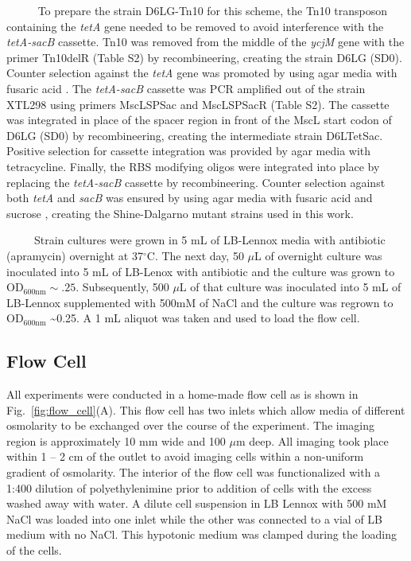 \documentclass[12pt]{caltech_thesis}
\begin{document}
~~~~~ To prepare the strain D6LG-Tn10 for this scheme, the Tn10
transposon containing the \emph{tetA} gene needed to be removed to avoid
interference with the \emph{tetA-sacB} cassette. Tn10 was removed from
the middle of the \emph{ycjM} gene with the primer Tn10delR (Table S2)
by recombineering, creating the strain D6LG (SD0). Counter selection
against the \emph{tetA} gene was promoted by using agar media with
fusaric acid \autocite{bochner1980,li2013}. The \emph{tetA-sacB}
cassette was PCR amplified out of the strain XTL298 using primers
MscLSPSac and MscLSPSacR (Table S2). The cassette was integrated in
place of the spacer region in front of the MscL start codon of D6LG
(SD0) by recombineering, creating the intermediate strain D6LTetSac.
Positive selection for cassette integration was provided by agar media
with tetracycline. Finally, the RBS modifying oligos were integrated
into place by replacing the \emph{tetA-sacB} cassette by recombineering.
Counter selection against both \emph{tetA} and \emph{sacB} was ensured
by using agar media with fusaric acid and sucrose \autocite{li2013},
creating the Shine-Dalgarno mutant strains used in this work.

~~~~~Strain cultures were grown in 5 mL of LB-Lennox media with
antibiotic (apramycin) overnight at 37\(^\circ\)C. The next day, 50
\(\mu\)L of overnight culture was inoculated into 5 mL of LB-Lenox with
antibiotic and the culture was grown to OD\(_\text{600nm} \sim .25\).
Subsequently, 500 \(\mu\)L of that culture was inoculated into 5 mL of
LB-Lennox supplemented with 500mM of NaCl and the culture was regrown to
OD\(_\text{600nm}\) \textasciitilde0.25. A 1 mL aliquot was taken and
used to load the flow cell.

\hypertarget{flow-cell}{%
\subsection{Flow Cell}\label{flow-cell}}

All experiments were conducted in a home-made flow cell as is shown in
Fig.~\ref{fig:flow_cell}(A). This flow cell has two inlets which allow
media of different osmolarity to be exchanged over the course of the
experiment. The imaging region is approximately 10 mm wide and 100
\(\mu\)m deep. All imaging took place within 1 -- 2 cm of the outlet to
avoid imaging cells within a non-uniform gradient of osmolarity. The
interior of the flow cell was functionalized with a 1:400 dilution of
polyethylenimine prior to addition of cells with the excess washed away
with water. A dilute cell suspension in LB Lennox with 500 mM NaCl was
loaded into one inlet while the other was connected to a vial of LB
medium with no NaCl. This hypotonic medium was clamped during the
loading of the cells.
\end{document}
